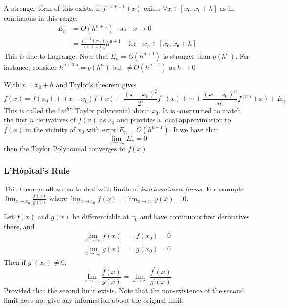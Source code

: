 \documentclass{article}
\begin{document}
A stronger form of this exists, if $f^{(n+1)}(x)$ exists $\forall x \in [x_0, x_0 + h]$ as in continuous in this range,
\begin{align*}
    E_n &= O(h^{n+1}) \quad \text{as} \quad x \rightarrow 0 \\
    &= \frac{f^{n+1}(x_n)}{(n+1)!}h^{n+1} \quad \text{for} \quad x_n \in [x_0, x_0 +h]
\end{align*}
This is due to Lagrange. Note that $E_n = O(h^{n+1})$ is stronger than $\underline{o}(h^n)$. For instance, consider $h^{n + 0.5} = \underline{o}(h^n)$ but $\neq O(h^{n+1})$ as $h \rightarrow 0$

\begin{defi}
    With $x = x_0 + h$ and Taylor's theorem gives
    \[
        f(x) = f(x_0) + (x - x_0)f^{\prime}(x) + \frac{(x - x_0)^2}{2!}f^{\prime\prime}(x) + \cdots + \frac{(x - x_0)^n}{n!}f^{(n)}(x) + E_n
    \]
    This is called the ``$n^{th}$'' Taylor polynomial about $x_0$. It is constructed to match the first $n$ derivatives of $f(x)$ as $x_0$ and provides a local approximation to $f(x)$ in the vicinity of $x_0$ with error $E_n = O(h^{n+1})$. If we have that
    \[
        \lim_{n \rightarrow \infty}{E_n} = 0  
    \]
    then the Taylor Polynomial converges to $f(x)$
\end{defi}

\subsubsection{L'H\^opital's Rule}
This theorem allows us to deal with limits of \emph{indeterminant forms}. For example $\lim_{x \rightarrow x_0}{\frac{f(x)}{g(x)}}$ where $\lim_{x \rightarrow x_0}{f(x)} = \lim_{x \rightarrow x_0}{g(x)} = 0$.

\begin{thm}
    Let $f(x)$ and $g(x)$ be differentiable at $x_0$ and have continuous first derivatives there, and
    \begin{align*}
        \lim_{x \rightarrow x_0}{f(x)} &= f(x_0) = 0 \\
        \lim_{x \rightarrow x_0}{g(x)} &= g(x_0) = 0
    \end{align*}
    Then if $g^{\prime}(x_0) \neq 0$,
    \[
        \lim_{x \rightarrow x_0}{\frac{f(x)}{g(x)}} = \lim_{x \rightarrow x_0}{\frac{f^{\prime}(x)}{g^{\prime}(x)}}
    \]
    Provided that the second limit exists. Note that the non-existence of the second limit does not give any information about the original limit.
\end{thm}
\end{document}
